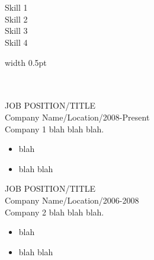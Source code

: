 \documentclass[12pt, a4paper, conference]{IEEEtran}
\newcommand{\borderthickness}{0.5pt}
\begin{document}
\begin{minipage}[t][5cm][t]{0.3\textwidth}
{}\\
\\
\hspace*{0pt}\hfill
Skill 1\\

\hspace*{0pt}\hfill
Skill 2\\

\hspace*{0pt}\hfill
Skill 3\\

\hspace*{0pt}\hfill
Skill 4\\


\end{minipage}
\quad
\textcolor{bordercolour}{\vrule height 4ex width \borderthickness}
\quad
\begin{minipage}[t][5cm][t]{0.6\textwidth}
{}\\
\\
JOB POSITION/TITLE\\
Company Name/Location/2008-Present\\
Company 1 blah blah blah.
\begin{itemize}
\item blah
\item blah blah\\
\end{itemize}

JOB POSITION/TITLE\\
Company Name/Location/2006-2008\\
Company 2 blah blah blah.
\begin{itemize}
\item blah
\item blah blah
\end{itemize}

\end{minipage}

\noindent\makebox[0cm]{\textcolor{bordercolour}{\rule{12.85cm}{\borderthickness}}}
\end{document}
